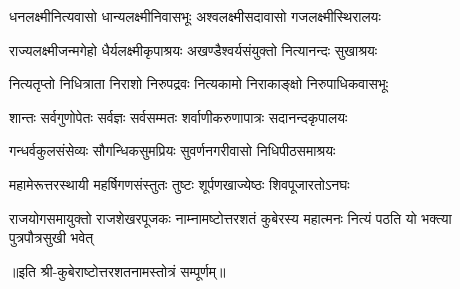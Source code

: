 \twolineshloka
{धनलक्ष्मीनित्यवासो धान्यलक्ष्मीनिवासभूः}
{अश्वलक्ष्मीसदावासो गजलक्ष्मीस्थिरालयः} %

\twolineshloka
{राज्यलक्ष्मीजन्मगेहो धैर्यलक्ष्मीकृपाश्रयः}
{अखण्डैश्वर्यसंयुक्तो नित्यानन्दः सुखाश्रयः} %

\twolineshloka
{नित्यतृप्तो निधित्राता निराशो निरुपद्रवः}
{नित्यकामो निराकाङ्क्षो निरुपाधिकवासभूः} %

\twolineshloka
{शान्तः सर्वगुणोपेतः सर्वज्ञः सर्वसम्मतः}
{शर्वाणीकरुणापात्रः सदानन्दकृपालयः} %

\twolineshloka
{गन्धर्वकुलसंसेव्यः सौगन्धिकसुमप्रियः}
{सुवर्णनगरीवासो निधिपीठसमाश्रयः} %

\twolineshloka
{महामेरूत्तरस्थायी महर्षिगणसंस्तुतः}
{तुष्टः शूर्पणखाज्येष्ठः शिवपूजारतोऽनघः} %

\threelineshloka
{राजयोगसमायुक्तो राजशेखरपूजकः}
{नाम्नामष्टोत्तरशतं कुबेरस्य महात्मनः}
{नित्यं पठति यो भक्त्या पुत्रपौत्रसुखी भवेत्} %

{॥इति श्री-कुबेराष्टोत्तरशतनामस्तोत्रं सम्पूर्णम्॥}
